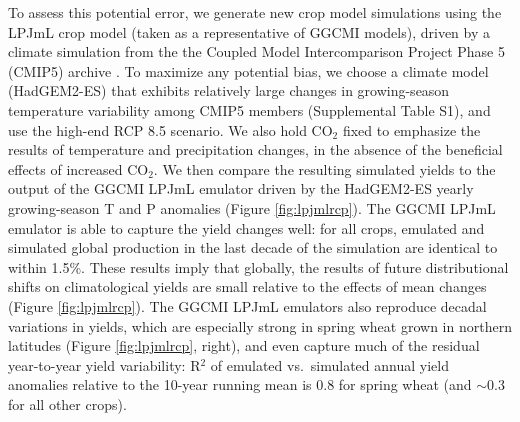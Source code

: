 \documentclass[gmdd]{copernicus} %
\begin{document}
To assess this potential error, we generate new crop model simulations using the LPJmL crop model (taken as a representative of GGCMI models), driven by a climate simulation from the the Coupled Model Intercomparison Project Phase 5 (CMIP5) archive \citep{Jones2011h, Martin2011, Taylor2012}.
To maximize any potential bias, we choose a climate model (HadGEM2-ES) that exhibits relatively large changes in growing-season temperature variability among CMIP5 members (Supplemental Table S1), and use the high-end RCP 8.5 scenario. We also hold CO$_2$ fixed to emphasize the results of temperature and precipitation changes, in the absence of the beneficial effects of increased CO$_2$. 
We then compare the resulting simulated yields to the output of the  GGCMI LPJmL emulator driven by the HadGEM2-ES yearly growing-season T and P anomalies (Figure \ref{fig:lpjmlrcp}).
The GGCMI LPJmL emulator is able to capture the yield changes well: for all crops, emulated and simulated global production in the last decade of the simulation are identical to within 1.5\%.
These results imply that globally, the results of future distributional shifts on climatological yields are small relative to the effects of mean changes (Figure \ref{fig:lpjmlrcp}). 
The GGCMI LPJmL emulators also reproduce decadal variations in yields, which are especially strong in spring wheat grown in northern latitudes (Figure \ref{fig:lpjmlrcp}, right), and even capture much of the residual year-to-year yield variability: R$^2$ of emulated vs.\ simulated annual yield anomalies relative to the 10-year running mean is 0.8 for spring wheat (and $\sim$0.3 for all other crops).

\end{document}

